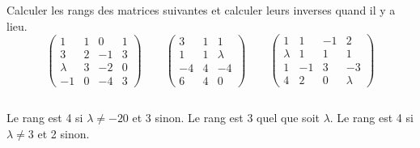 \documentclass{magnolia}
\begin{document}
Calculer les rangs des matrices suivantes et calculer leurs inverses quand il y
a lieu.
\[\begin{pmatrix}
   1 & 1 & 0 & 1\\
   3 & 2 & -1 & 3\\
   \lambda & 3 & -2 & 0\\
   -1 & 0 & -4 & 3
  \end{pmatrix}\qquad
  \begin{pmatrix}
  3 & 1 & 1\\
  1 & 1 & \lambda\\
  -4 & 4 & -4\\
  6 & 4 & 0
  \end{pmatrix}\qquad
  \begin{pmatrix}
  1 & 1 & -1 & 2\\
  \lambda & 1 & 1 & 1\\
  1 & -1 & 3 & -3\\
  4 & 2 & 0 & \lambda
  \end{pmatrix}\]
\begin{sol}
$\quad$
\begin{questions}
\question Le rang est 4 si $\lambda\neq -20$ et 3 sinon.
\question Le rang est 3 quel que soit $\lambda$.
\question Le rang est 4 si $\lambda\neq 3$ et 2 sinon.
\end{questions}
\end{sol}








\end{document}
